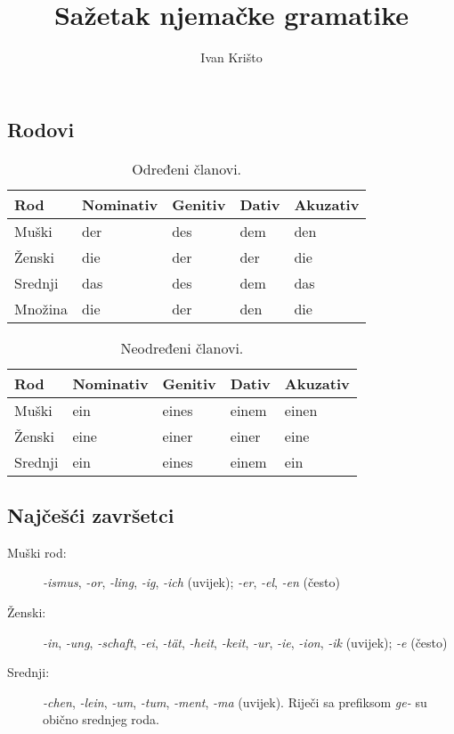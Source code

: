 \documentclass[12pt,german]{article}
\author{Ivan Krišto}
\newcommand{\nastavak}[1]{\emph{-#1}}
\newcommand{\prefiks}[1]{\emph{#1-}}
\begin{document}
\title{Sažetak njemačke gramatike}
\date{}
\maketitle


\begin{multicols}{2}
\section{Rodovi}

\begin{table}[H]
\caption{Određeni članovi.}
\begin{tabular}{@{} lllll @{}}
\toprule
Rod & Nominativ & Genitiv & Dativ & Akuzativ \\
\midrule
Muški & der & des & dem & den \\
Ženski & die & der & der & die \\
Srednji & das & des & dem & das \\
Množina & die & der & den & die \\
\bottomrule
\end{tabular}
\end{table}

\begin{table}[H]
\caption{Neodređeni članovi.}
\begin{tabular}{@{} lllll @{}}
\toprule
Rod & Nominativ & Genitiv & Dativ & Akuzativ \\
\midrule
Muški & ein & eines & einem & einen \\
Ženski & eine & einer & einer & eine \\
Srednji & ein & eines & einem & ein \\
\bottomrule
\end{tabular}
\end{table}

\subsection{Najčešći završetci}
\begin{description}
  \item[Muški rod:]
    \nastavak{ismus}, \nastavak{or}, \nastavak{ling}, \nastavak{ig},
    \nastavak{ich} (uvijek); \nastavak{er}, \nastavak{el}, \nastavak{en}
    (često)
  \item[Ženski:]
    \nastavak{in}, \nastavak{ung}, \nastavak{schaft}, \nastavak{ei},
    \nastavak{t\"at}, \nastavak{heit}, \nastavak{keit}, \nastavak{ur},
    \nastavak{ie}, \nastavak{ion}, \nastavak{ik} (uvijek);
    \nastavak{e} (često)
  \item[Srednji:]
    \nastavak{chen}, \nastavak{lein}, \nastavak{um}, \nastavak{tum},
    \nastavak{ment}, \nastavak{ma} (uvijek). Riječi sa prefiksom \prefiks{ge}
    su obično srednjeg roda.
\end{description}


\end{multicols}
\end{document}
